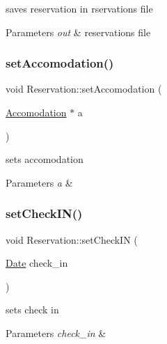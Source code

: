 saves reservation in rservations file 


\begin{DoxyParams}{Parameters}
{\em out} & reservations file \\
\hline
\end{DoxyParams}
\hypertarget{class_reservation_a17a9412b83e734b18692d007069e904e}{}\label{class_reservation_a17a9412b83e734b18692d007069e904e} 
\subsubsection{\texorpdfstring{set\+Accomodation()}{setAccomodation()}}
{\footnotesize\ttfamily void Reservation\+::set\+Accomodation (\begin{DoxyParamCaption}\item[{\hyperlink{class_accomodation}{Accomodation} $\ast$}]{a }\end{DoxyParamCaption})\hspace{0.3cm}{\ttfamily [inline]}}



sets accomodation 


\begin{DoxyParams}{Parameters}
{\em a} & \\
\hline
\end{DoxyParams}
\hypertarget{class_reservation_a2751145be1295ec9c031157dddb2590b}{}\label{class_reservation_a2751145be1295ec9c031157dddb2590b} 
\subsubsection{\texorpdfstring{set\+Check\+I\+N()}{setCheckIN()}}
{\footnotesize\ttfamily void Reservation\+::set\+Check\+IN (\begin{DoxyParamCaption}\item[{\hyperlink{class_date}{Date}}]{check\+\_\+in }\end{DoxyParamCaption})\hspace{0.3cm}{\ttfamily [inline]}}



sets check in 


\begin{DoxyParams}{Parameters}
{\em check\+\_\+in} & \\
\hline
\end{DoxyParams}
\hypertarget{class_reservation_a3ecb41a114fa2771f64e8a0486ab7f35}{}\label{class_reservation_a3ecb41a114fa2771f64e8a0486ab7f35} 

